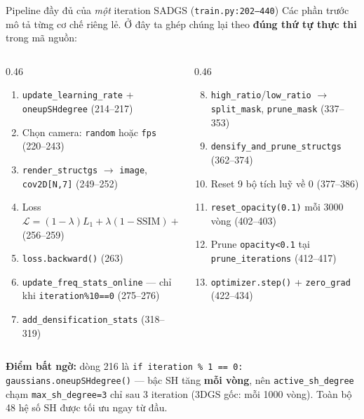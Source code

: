 
\begin{frame}{Pipeline đầy đủ của \emph{một} iteration SADGS (\texttt{train.py:202--440})}
\scriptsize
Các phần trước mô tả từng cơ chế riêng lẻ. Ở đây ta ghép chúng lại theo \textbf{đúng thứ tự thực thi} trong mã nguồn:
\begin{columns}[T]
\begin{column}{0.46\textwidth}
\begin{enumerate}\setlength{\itemsep}{0pt}
    \item \texttt{update\_learning\_rate} + \texttt{oneupSHdegree} (214--217)
    \item Chọn camera: \texttt{random} hoặc \texttt{fps} (220--243)
    \item \texttt{render\_structgs} $\to$ \texttt{image}, \texttt{cov2D[N,7]} (249--252)
    \item Loss $\mathcal{L}=(1{-}\lambda)L_1+\lambda(1{-}\text{SSIM})+\lambda_{L2}L_2$ (256--259)
    \item \texttt{loss.backward()} (263)
    \item \texttt{update\_freq\_stats\_online} --- \alert{chỉ khi} \texttt{iteration\%10==0} (275--276)
    \item \texttt{add\_densification\_stats} (318--319)
\end{enumerate}
\end{column}
\begin{column}{0.46\textwidth}
\begin{enumerate}\setcounter{enumi}{7}\setlength{\itemsep}{0pt}
    \item \texttt{high\_ratio}/\texttt{low\_ratio} $\to$ \texttt{split\_mask}, \texttt{prune\_mask} (337--353)
    \item \texttt{densify\_and\_prune\_structgs} (362--374)
    \item Reset 9 bộ tích luỹ về 0 (377--386)
    \item \texttt{reset\_opacity(0.1)} mỗi 3000 vòng (402--403)
    \item Prune \texttt{opacity<0.1} tại \texttt{prune\_iterations} (412--417)
    \item \texttt{optimizer.step()} + \texttt{zero\_grad} (422--434)
\end{enumerate}
\end{column}
\end{columns}
\vspace{1mm}
\textbf{Điểm bất ngờ:} dòng 216 là \texttt{if iteration \% 1 == 0: gaussians.oneupSHdegree()} --- bậc SH tăng \textbf{mỗi vòng}, nên \texttt{active\_sh\_degree} chạm \texttt{max\_sh\_degree=3} chỉ sau 3 iteration (3DGS gốc: mỗi 1000 vòng). Toàn bộ 48 hệ số SH được tối ưu ngay từ đầu.
\end{frame}


